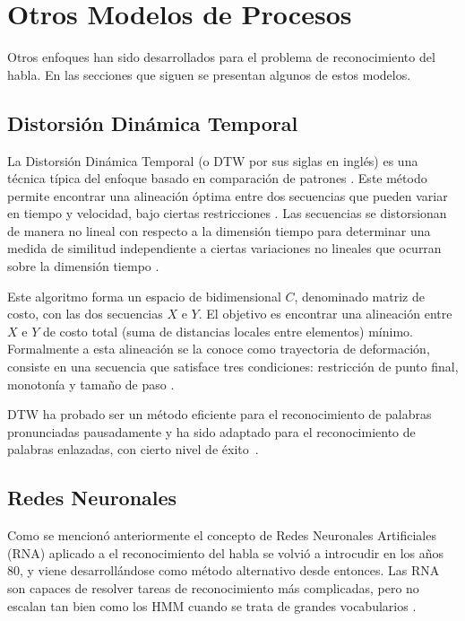 \section{Otros Modelos de Procesos}
\label{sec:otrosModelos}

Otros enfoques han sido desarrollados para el problema de reconocimiento del habla. En las secciones que siguen
se presentan algunos de estos modelos.

\subsection{Distorsi\'on Din\'amica Temporal}
\label{sec:dtw}

La Distorsi\'on Din\'amica Temporal (o DTW por sus siglas en ingl\'es) es una t\'ecnica t\'ipica del enfoque
basado en comparaci\'on de patrones \cite{GaikwadAReview2010}. Este m\'etodo permite encontrar una alineaci\'on \'optima 
entre dos secuencias que pueden variar en tiempo y velocidad, bajo ciertas restricciones \cite{MullerInformation2007}.
Las secuencias se distorsionan de manera no lineal con respecto a la dimensi\'on tiempo para determinar una medida
de similitud independiente a ciertas variaciones no lineales que ocurran sobre la dimensi\'on tiempo \cite{AnusuyaSpeech2009}.

Este algoritmo forma un espacio de bidimensional $C$, denominado matriz de costo, con las dos secuencias $X$ e $Y$. El objetivo es encontrar
una alineaci\'on entre $X$ e $Y$ de costo total (suma de distancias locales entre elementos) m\'inimo. 
Formalmente a esta alineaci\'on se la conoce como trayectoria de
deformaci\'on, consiste en una secuencia que satisface tres condiciones: restricci\'on de punto final, 
monoton\'ia y tama\~no de paso \cite{MullerInformation2007}.

DTW ha probado ser un m\'etodo eficiente para el reconocimiento de palabras pronunciadas pausadamente \cite{MyersALevel1981} y ha sido
adaptado para el reconocimiento de palabras enlazadas, con cierto nivel de 
\mbox{\'exito \cite{MyersALevel1981, SakoeTwoLevel1979, RabinerApplication1980}}.

\subsection{Redes Neuronales}
\label{sec:otrosModelosANN}

Como se mencion\'o anteriormente el concepto de Redes Neuronales Artificiales (RNA) aplicado a el reconocimiento
del habla se volvi\'o a introcudir en los a\~nos 80, 
y viene desarroll\'andose como m\'etodo alternativo desde entonces. Las RNA son capaces de resolver tareas de reconocimiento
m\'as complicadas, pero no escalan tan bien como los HMM cuando se trata de grandes vocabularios \cite{VimalaReview2012}.

